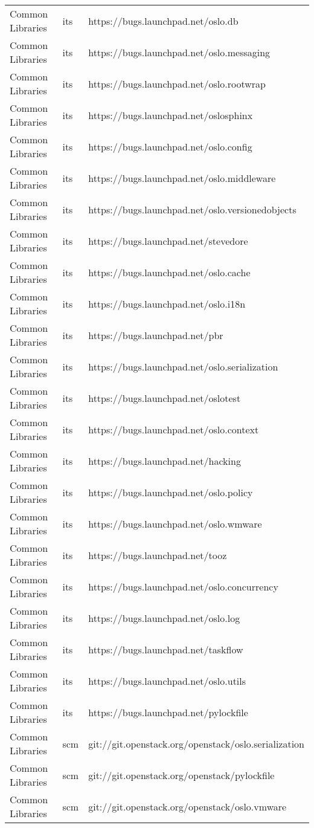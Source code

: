 \begin{center}
\begin{longtable}{|p{4cm}|p{1cm}|p{10cm}|}
Common Libraries&its&https://bugs.launchpad.net/oslo.db\\ 
Common Libraries&its&https://bugs.launchpad.net/oslo.messaging\\ 
Common Libraries&its&https://bugs.launchpad.net/oslo.rootwrap\\ 
Common Libraries&its&https://bugs.launchpad.net/oslosphinx\\ 
Common Libraries&its&https://bugs.launchpad.net/oslo.config\\ 
Common Libraries&its&https://bugs.launchpad.net/oslo.middleware\\ 
Common Libraries&its&https://bugs.launchpad.net/oslo.versionedobjects\\ 
Common Libraries&its&https://bugs.launchpad.net/stevedore\\ 
Common Libraries&its&https://bugs.launchpad.net/oslo.cache\\ 
Common Libraries&its&https://bugs.launchpad.net/oslo.i18n\\ 
Common Libraries&its&https://bugs.launchpad.net/pbr\\ 
Common Libraries&its&https://bugs.launchpad.net/oslo.serialization\\ 
Common Libraries&its&https://bugs.launchpad.net/oslotest\\ 
Common Libraries&its&https://bugs.launchpad.net/oslo.context\\ 
Common Libraries&its&https://bugs.launchpad.net/hacking\\ 
Common Libraries&its&https://bugs.launchpad.net/oslo.policy\\ 
Common Libraries&its&https://bugs.launchpad.net/oslo.wmware\\ 
Common Libraries&its&https://bugs.launchpad.net/tooz\\ 
Common Libraries&its&https://bugs.launchpad.net/oslo.concurrency\\ 
Common Libraries&its&https://bugs.launchpad.net/oslo.log\\ 
Common Libraries&its&https://bugs.launchpad.net/taskflow\\ 
Common Libraries&its&https://bugs.launchpad.net/oslo.utils\\ 
Common Libraries&its&https://bugs.launchpad.net/pylockfile\\ 
Common Libraries&scm&git://git.openstack.org/openstack/oslo.serialization\\ 
Common Libraries&scm&git://git.openstack.org/openstack/pylockfile\\ 
Common Libraries&scm&git://git.openstack.org/openstack/oslo.vmware\\ 

\end{longtable}
\end{center}
